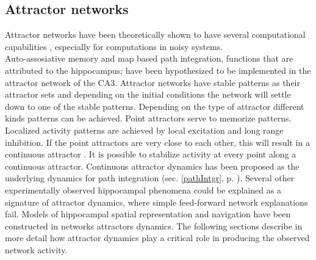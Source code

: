 



\subsection{Attractor networks}
Attractor networks have been theoretically shown to have several computational capabilities \cite{Amit1992}, especially for computations in noisy systems.\\
Auto-assosiative memory and map based path integration, functions that are attributed to the hippocampus; have been hypothesized to be implemented in the attractor network of the CA3. Attractor networks have stable patterns as their attractor sets and depending on the initial conditions the network will settle down to one of the stable patterns. Depending on the type of attractor different kinds patterns can be achieved. Point attractors serve to memorize patterns. Localized activity patterns are achieved by local excitation and long range inhibition. If the point attractors are very close to each other, this will result in a continuous attractor \cite{Trappenberg2003}. It is possible to stabilize activity at every point along a continuous attractor. Continuous attractor dynamics has been proposed as the underlying dynamics for path integration (sec. \ref{pathIntgr}, p. \pageref{pathIntgr}). Several other experimentally observed hippocampal phenomena could be explained as a signature of attractor dynamics, where simple feed-forward network explanations fail. Models of hippocampal spatial representation and navigation have been constructed in networks attractors dynamics. The following sections describe in more detail how attractor dynamics play a critical role in producing the observed network activity.

